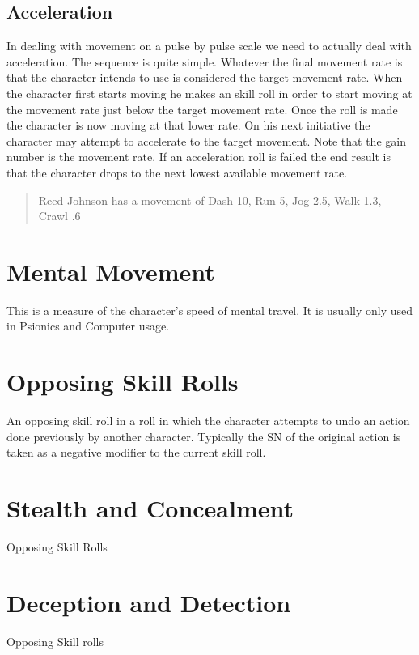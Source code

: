 \subsection{Acceleration}


In dealing with movement on a pulse by pulse scale we need to actually
deal with acceleration. The sequence is quite simple. Whatever the
final movement  rate is that the character intends to use is considered
the target movement rate. When the character first starts moving he
makes an skill roll in order to start moving at the movement
rate just below the target movement rate. Once the roll is made the
character is now moving at that lower rate. On his next  initiative the
character may attempt to accelerate to the target movement. Note  that
the gain number is the movement rate. If an acceleration roll is failed
the end result is that the character drops to the next lowest available
movement  rate. 

\begin{quotation}
Reed Johnson has a movement of Dash 10, Run 5, Jog 2.5, Walk 1.3, Crawl .6
\end{quotation}



\section{Mental Movement}
This is a measure of the character's speed of mental travel. It is 
usually only used in Psionics and Computer usage.

\section{Opposing Skill Rolls}

An opposing skill roll in a roll in which the character attempts to 
undo an action done previously by another character. Typically the SN 
of the original action is taken as a negative modifier to the current 
skill roll.

\section{Stealth and Concealment}

Opposing Skill Rolls

\section{Deception and Detection}

Opposing Skill rolls




